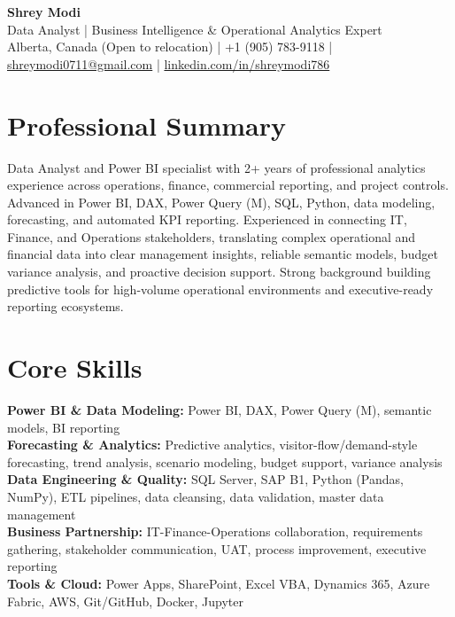 \documentclass[10.5pt,letterpaper]{article}
\begin{document}
\begin{center}
  {\Huge \bfseries \color{accent} Shrey Modi}\\[0.35em]
  {\normalsize Data Analyst | Business Intelligence \& Operational Analytics Expert}\\[0.25em]
  {\small
    Alberta, Canada (Open to relocation)
 | +1 (905) 783-9118 | \href{mailto:shreymodi0711@gmail.com}{shreymodi0711@gmail.com} | \href{https://linkedin.com/in/shreymodi786}{linkedin.com/in/shreymodi786}  }
\end{center}

\section{Professional Summary}
\noindent Data Analyst and Power BI specialist with 2+ years of professional analytics experience across operations, finance, commercial reporting, and project controls. Advanced in Power BI, DAX, Power Query (M), SQL, Python, data modeling, forecasting, and automated KPI reporting. Experienced in connecting IT, Finance, and Operations stakeholders, translating complex operational and financial data into clear management insights, reliable semantic models, budget variance analysis, and proactive decision support. Strong background building predictive tools for high-volume operational environments and executive-ready reporting ecosystems.


\section{Core Skills}
\noindent
\textbf{Power BI \& Data Modeling:} Power BI, DAX, Power Query (M), semantic models, BI reporting\\
\textbf{Forecasting \& Analytics:} Predictive analytics, visitor-flow/demand-style forecasting, trend analysis, scenario modeling, budget support, variance analysis\\
\textbf{Data Engineering \& Quality:} SQL Server, SAP B1, Python (Pandas, NumPy), ETL pipelines, data cleansing, data validation, master data management\\
\textbf{Business Partnership:} IT-Finance-Operations collaboration, requirements gathering, stakeholder communication, UAT, process improvement, executive reporting\\
\textbf{Tools \& Cloud:} Power Apps, SharePoint, Excel VBA, Dynamics 365, Azure Fabric, AWS, Git/GitHub, Docker, Jupyter\\
\end{document}
